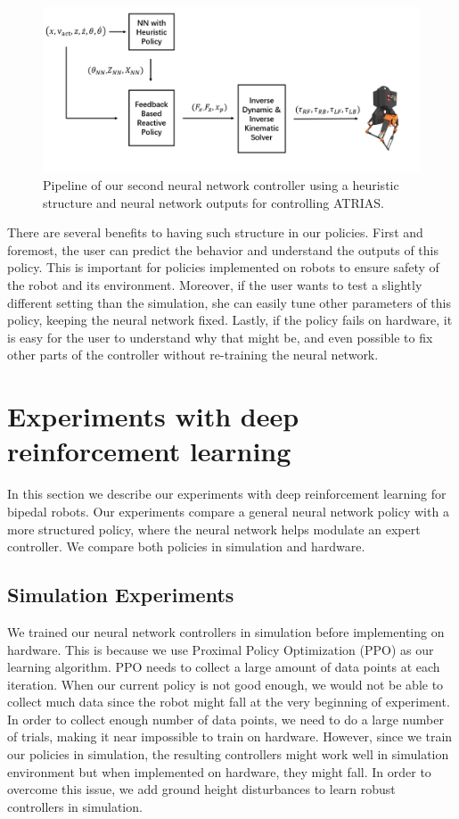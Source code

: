 \begin{figure}[!h]
	\centering
	\includegraphics[width=.7\textwidth]{./img/Heuristic.PNG}
    \caption{Pipeline of our second neural network controller using a heuristic structure and neural network outputs for controlling ATRIAS. }
    \label{fig:H_process}
\end{figure}

There are several benefits to having such structure in our policies. First and foremost, the user can predict the behavior and understand the outputs of this policy. This is important for policies implemented on robots to ensure safety of the robot and its environment. 
Moreover, if the user wants to test a slightly different setting than the simulation, she can easily tune other parameters of this policy, keeping the neural network fixed. Lastly, if the policy fails on hardware, it is easy for the user to understand why that might be, and even possible to fix other parts of the controller without re-training the neural network.


\section{Experiments with deep reinforcement learning}
In this section we describe our experiments with deep reinforcement learning for bipedal robots. Our experiments compare a general neural network policy with a more structured policy, where the neural network helps modulate an expert controller. We compare both policies in simulation and hardware.

\subsection{Simulation Experiments}
We trained our neural network controllers in simulation before implementing on hardware. This is because we use Proximal Policy Optimization (PPO) as our learning algorithm. PPO needs to collect a large amount of data points at each iteration. When our current policy is not good enough, we would not be able to collect much data since the robot might fall at the very beginning of experiment. In order to collect enough number of data points, we need to do a large number of trials, making it near impossible to train on hardware. However, since we train our policies in simulation, the resulting controllers might work well in simulation environment but when implemented on hardware, they might fall. In order to overcome this issue, we add ground height disturbances to learn robust controllers in simulation. %

